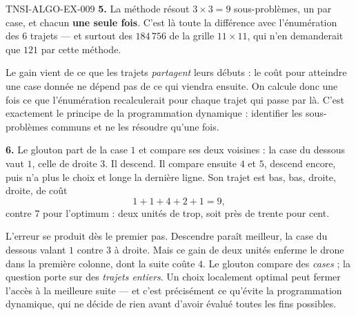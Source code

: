 \begin{corrige}{TNSI-ALGO-EX-009}
\textbf{5.} La méthode résout $3\times 3=9$ sous-problèmes, un par case, et
chacun \textbf{une seule fois}. C'est là toute la différence avec l'énumération
des $6$ trajets — et surtout des $184\,756$ de la grille $11\times 11$, qui n'en
demanderait que $121$ par cette méthode.

Le gain vient de ce que les trajets \emph{partagent} leurs débuts : le coût pour
atteindre une case donnée ne dépend pas de ce qui viendra ensuite. On calcule
donc une fois ce que l'énumération recalculerait pour chaque trajet qui passe par
là. C'est exactement le principe de la programmation dynamique : identifier les
sous-problèmes communs et ne les résoudre qu'une fois.

\textbf{6.} Le glouton part de la case $1$ et compare ses deux voisines : la
case du dessous vaut $1$, celle de droite $3$. Il descend. Il compare ensuite $4$
et $5$, descend encore, puis n'a plus le choix et longe la dernière ligne. Son
trajet est bas, bas, droite, droite, de coût
\[
  1+1+4+2+1=9,
\]
contre $7$ pour l'optimum : deux unités de trop, soit près de trente pour cent.

L'erreur se produit dès le premier pas. Descendre paraît meilleur, la case du
dessous valant $1$ contre $3$ à droite. Mais ce gain de deux unités enferme le
drone dans la première colonne, dont la suite coûte $4$. Le glouton compare des
\emph{cases} ; la question porte sur des \emph{trajets entiers}. Un choix
localement optimal peut fermer l'accès à la meilleure suite — et c'est
précisément ce qu'évite la programmation dynamique, qui ne décide de rien avant d'avoir évalué
toutes les fins possibles.
\end{corrige}
